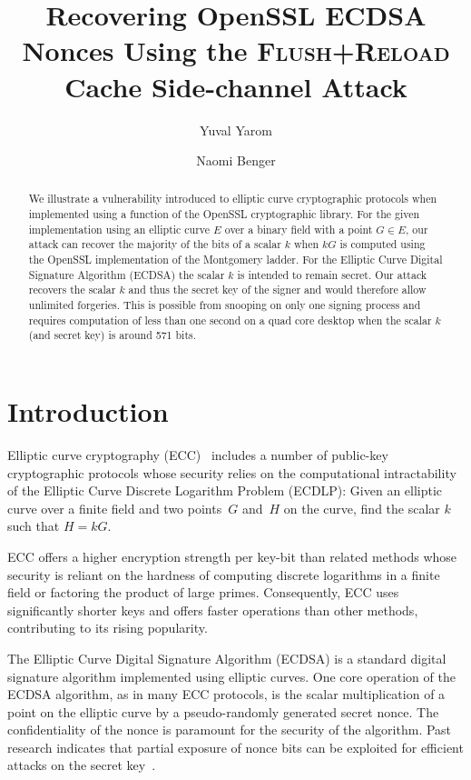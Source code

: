 \documentclass[twocolumn]{svjour3}
\newcommand{\fl}{\textsc{Flu\-sh+\allowbreak Re\-load}\xspace}
\newcommand{\myupcase}[1]{\uppercase{#1}}
\begin{document}
\title{Recovering OpenSSL ECDSA Nonces Using the \fl Cache Side-channel Attack}
\author{Yuval Yarom \and Naomi Benger}

\maketitle

\begin{abstract}
We illustrate a vulnerability introduced to elliptic curve cryptographic protocols when implemented using a function of the OpenSSL cryptographic library.
For the given implementation using an elliptic curve $E$ over a binary field with a point $G\in E$, our attack can recover the majority of the bits of a scalar $k$ when $kG$ is computed using the OpenSSL implementation of the Montgomery ladder. 
For the Elliptic Curve Digital Signature Algorithm (\myupcase{ecdsa}) the scalar $k$ is intended to remain secret. 
Our attack recovers the scalar $k$ and thus the secret key of the signer and would therefore allow unlimited forgeries. 
This is possible from snooping on only one signing process and requires computation of less than one second on a quad core desktop when the scalar $k$ (and secret key) is around 571 bits.

\end{abstract}

\section{Introduction}
Elliptic curve cryptography (\myupcase{ecc})~\cite{miller85use,koblitz87elliptic} includes a number of public-key cryptographic protocols whose security relies on the computational intractability of the Elliptic Curve Discrete Logarithm Problem (\myupcase{ecdlp}): Given an elliptic curve over a finite field and two points~$G$ and~$H$ on the curve, find the scalar $k$ such that $H=kG$.

\myupcase{ecc} offers a higher encryption strength per key-bit than related methods whose security is reliant on the hardness of computing discrete logarithms in a finite field or factoring the product of large primes. Consequently, \myupcase{ecc} uses significantly shorter keys and offers faster operations than other methods, contributing to its rising popularity.

The Elliptic Curve Digital Signature Algorithm (\myupcase{ecdsa}) \cite{johnson01elliptic,fips,ansi962} is a standard
digital signature algorithm implemented using elliptic curves. One core operation of the \myupcase{ecdsa} algorithm, as in many \myupcase{ecc} protocols, is the scalar multiplication of a point on the elliptic curve by a pseudo-randomly generated secret nonce. The confidentiality of the nonce is paramount for the security of the algorithm. Past research indicates that partial exposure of nonce bits can be exploited for efficient attacks on the secret key~\cite{nguyen03insecurity,brumley11remote}.
\end{document}
